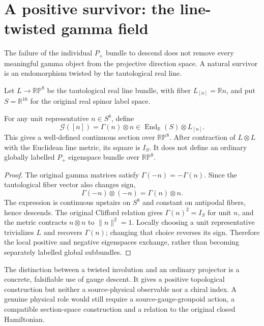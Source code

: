 \section{A positive survivor: the line-twisted gamma field}
The failure of the individual $P_+$ bundle to descend
does not remove every meaningful gamma object from
the projective direction space. A natural survivor is
an endomorphism twisted by the tautological real line.

Let $L\to\mathbb{RP}^8$ be the tautological real
line bundle, with fiber $L_{[n]}=\mathbb R n$,
and put $S=\mathbb R^{16}$ for the original
real spinor label space.

\begin{proposition}\label{prop:twisted-projective-gamma}
For any unit representative $n\in S^8$, define
\begin{equation}\label{eq:twisted-projective-gamma}
 \mathscr G([n])=\Gamma(n)\otimes n
 \in \operatorname{End}_{\mathbb R}(S)\otimes L_{[n]}.
\end{equation}
This gives a well-defined continuous section over
$\mathbb{RP}^8$. After contraction of
$L\otimes L$ with the Euclidean line metric, its
square is $I_S$. It does not define an ordinary
globally labelled $P_+$ eigenspace bundle over
$\mathbb{RP}^8$.
\end{proposition}
\begin{proof}
The original gamma matrices satisfy
$\Gamma(-n)=-\Gamma(n)$. Since the tautological
fiber vector also changes sign,
\[
 \Gamma(-n)\otimes(-n)=\Gamma(n)\otimes n.
\]
The expression is continuous upstairs on $S^8$
and constant on antipodal fibers, hence descends.
The original Clifford relation gives
$\Gamma(n)^2=I_S$ for unit $n$, and the metric
contracts $n\otimes n$ to $\|n\|^2=1$.
Locally choosing a unit representative trivializes
$L$ and recovers $\Gamma(n)$; changing that choice
reverses its sign. Therefore the local positive
and negative eigenspaces exchange, rather than
becoming separately labelled global subbundles.
\end{proof}

The distinction between a twisted involution and an
ordinary projector is a concrete, falsifiable use
of gauge descent. It gives a positive topological
construction but neither a source-physical observable
nor a chiral index. A genuine physical role would
still require a source-gauge-groupoid action, a
compatible section-space construction and a relation
to the original closed Hamiltonian.

